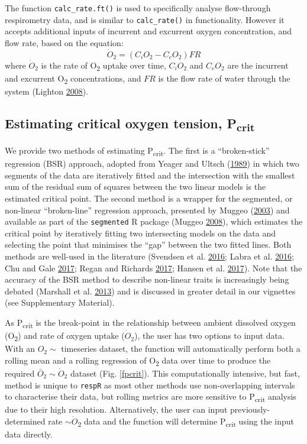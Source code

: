 \documentclass[a4paper,10pt, oneside]{memoir}
\begin{document}
The function \texttt{calc\_rate.ft()} is used to specifically analyse flow-through respirometry data, and is similar to \texttt{calc\_rate()} in functionality. However it accepts additional inputs of incurrent and excurrent oxygen concentration, and flow rate, based on the equation: \[\dot O_2 = (C_iO_2 - C_eO_2)FR\] where \(\dot{O} \mathrm{_2}\) is the rate of O\textsubscript{2} uptake over time, \(C_iO_2\) and \(C_eO_2\) are the incurrent and excurrent O\textsubscript{2} concentrations, and \(FR\) is the flow rate of water through the system (Lighton \protect\hyperlink{ref-Lighton2008}{2008}).

\subsection{Estimating critical oxygen tension, P\textsubscript{crit}}

We provide two methods of estimating P\textsubscript{crit}. The first is a ``broken-stick'' regression (BSR) approach, adopted from Yeager and Ultsch (\protect\hyperlink{ref-Yeager1989}{1989}) in which two segments of the data are iteratively fitted and the intersection with the smallest sum of the residual sum of squares between the two linear models is the estimated critical point.
The second method is a wrapper for the segmented, or non-linear ``broken-line'' regression approach, presented by Muggeo (\protect\hyperlink{ref-Muggeo2003}{2003}) and available as part of the \texttt{segmented} R package (Muggeo \protect\hyperlink{ref-Muggeo2008}{2008}), which estimates the critical point by iteratively fitting two intersecting models on the data and selecting the point that minimises the ``gap'' between the two fitted lines.
Both methods are well-used in the literature (Svendsen et al. \protect\hyperlink{ref-Svendsen2016}{2016}; Labra et al. \protect\hyperlink{ref-Labra2016}{2016}; Chu and Gale \protect\hyperlink{ref-Chu2017}{2017}; Regan and Richards \protect\hyperlink{ref-Regan2017}{2017}; Hansen et al. \protect\hyperlink{ref-Hansen2017}{2017}).
Note that the accuracy of the BSR method to describe non-linear traits is increasingly being debated (Marshall et al. \protect\hyperlink{ref-Marshall2013}{2013}) and is discussed in greater detail in our vignettes (see Supplementary Material).

As P\textsubscript{crit} is the break-point in the relationship between ambient dissolved oxygen (O\textsubscript{2}) and rate of oxygen uptake (\(\dot{O} \mathrm{_2}\)), the user has two options to input data.
With an \(O_2 \sim\) timeseries dataset, the function will automatically perform both a rolling mean and a rolling regression of O\textsubscript{2} data over time to produce the required \(\bar O_2 \sim \dot O_2\) dataset (Fig. \ref{fpcrit}).
This computationally intensive, but fast, method is unique to \texttt{respR} as most other methods use non-overlapping intervals to characterise their data, but rolling metrics are more sensitive to P\textsubscript{crit} analysis due to their high resolution.
Alternatively, the user can input previously-determined rate \(\sim \dot{O}\)\textsubscript{2} data and the function will determine P\textsubscript{crit} using the input data directly.
\end{document}
